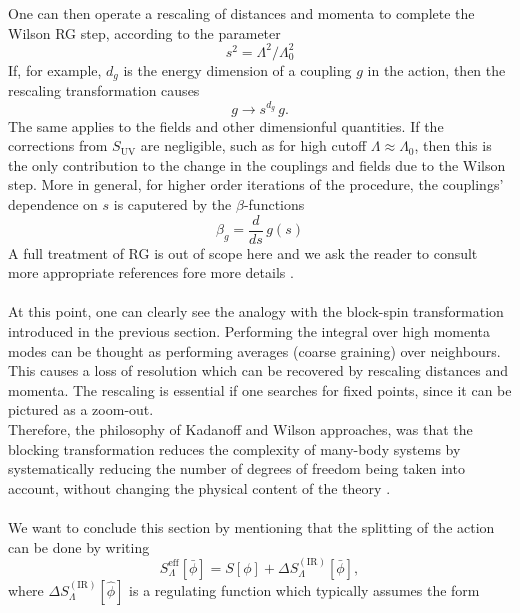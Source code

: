 One can then operate a rescaling of distances and momenta to complete the Wilson RG step, according to the parameter 
\begin{equation*}
    s^2 = \Lambda^2 / \Lambda_0^2
\end{equation*}
If, for example, $d_g$ is the energy dimension of a coupling $g$ in the action, then the rescaling transformation causes 
\begin{equation*} 
    g \to s^{d_g} \, g.
\end{equation*}
The same applies to the fields and other dimensionful quantities. If the corrections from $S_\text{UV}$ are negligible, such as for high cutoff $\Lambda \approx \Lambda_0$, then this is the only contribution to the change in the couplings and fields due to the Wilson step. More in general, for higher order iterations of the procedure, the couplings' dependence on $s$ is caputered by the $\beta$-functions 
\begin{equation*}
    \beta_g = \frac{d}{ds} \, g(s)
\end{equation*}
A full treatment of RG is out of scope here and we ask the reader to consult more appropriate references fore more details \cite{Peskin:1995ev}. \\~\\
At this point, one can clearly see the analogy with the block-spin transformation introduced in the previous section. Performing the integral over high momenta modes
can be thought as performing averages (coarse graining) over neighbours. This causes a loss of resolution which can be recovered by rescaling distances and momenta. The rescaling is essential if one searches for fixed points, since it can be pictured as a zoom-out. \\
Therefore, the philosophy of Kadanoff and Wilson approaches, was that the blocking transformation reduces the complexity of many-body systems by systematically reducing the number of degrees of freedom being taken into account, without changing the physical content of the
theory \cite{WILSON197475,carosso2020novel}. \\~\\
We want to conclude this section by mentioning that the splitting of the action can be done by writing
\begin{equation*}
    S^\text{eff}_\Lambda[\bar\phi] = S[\phi] + \Delta S_{\Lambda}^{(\mathrm{IR})}[\bar\phi],
\end{equation*}
where $\Delta S_{\Lambda}^{(\mathrm{IR})}[\hat{\phi}]$ is a regulating function which typically assumes the form
